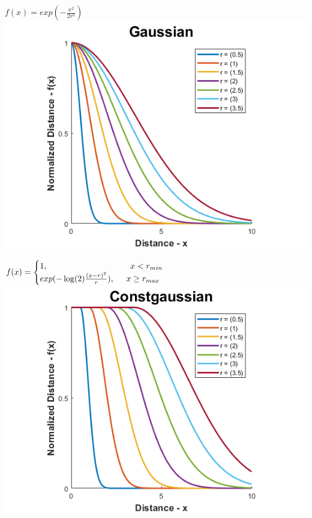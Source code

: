 \documentclass[12pt, a4paper, titlepage, openany]{book}
\begin{document}
\begin{description}[labelsep=1cm, labelwidth=2cm, nosep,,style=multiline,leftmargin=3cm]
\begin{description}[labelsep=14em, labelwidth=10em, nosep,style=multiline,leftmargin=6cm]
	\item[\texttt{"gaussian"}] $f\left( x \right) = exp(-\frac{x^2}{2r^{2}})$ \\ 
		\includegraphics[scale=.5]{FuzzGaussv1.png} \\

	\item[\texttt{"constgaussian"}] $f(x) = \begin{cases} 1,  \hspace{35mm}  x<r_{min} 
	\\  exp(-\log(2)\frac{(x-r)^2}{r}),  \hspace{5mm}  x\ge r_{max} \end{cases}$\\
		\includegraphics[scale=.5]{FuzzCGv1.png} \\


\end{description}
\end{description}
\end{document}
